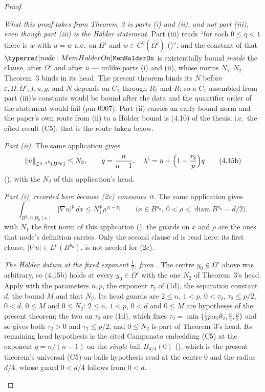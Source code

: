 \begin{proof}
\begin{enumerate}
  \emph{What this proof takes from Theorem~3 is parts \textup{(i)} and
  \textup{(ii)}, and \emph{not} part \textup{(iii)}, even though part
  \textup{(iii)} is the H\"older statement.}  Part (iii) reads ``for each
  $0\le\eta<1$ there is $w$ with $u=w$ a.e.\ on $\Omega'$ and
  $w\in C^{\eta}(\overline{\Omega'})$ ()'', and the
  constant of that $\noderef{MemHolderOn}$ is existentially bound \emph{inside}
  the clause, after $\Omega'$ and after $u$ --- unlike parts (i) and (ii), whose
  norms $N_1,N_2$ Theorem~3 binds in its head.  The present theorem binds its
  $N$ before $\varepsilon,\Omega,\Omega',f,u,g$, and $N$ depends on $C_1$
  through $R_1$ and $R$; so a $C_1$ assembled from part (iii)'s constants would
  be bound after the data and the quantifier order of the statement would fail
  (pm-0007).  Part (ii) carries an early-bound norm and the paper's own route
  from (ii) to a H\"older bound is (4.10) of the thesis, i.e.\ the cited result (C5);
  that is the route taken below.

  \emph{Part \textup{(ii)}.}  The same application gives
  \[
  \|u\|_{\mathcal L^{q,\,\lambda^\natural}(B^{y_0})}\le N_2 ,
  \qquad
  q=\frac n{n-1},\quad \lambda^\natural=n+\Bigl(1-\frac{\tau_2}p\Bigr)q
  \tag{4.15b}
  \]
  (), with the $N_2$ of this application's head.

  \emph{Part \textup{(i)}, recorded here because \textup{(2c)} consumes it.}
  The same application gives
  \[
  \int_{B^{y_0}\cap B_\rho(x)}|\nabla u|^p\,dx\le N_1^{\,p}\rho^{\,n-\tau_2}
  \qquad\bigl(x\in B^{y_0},\ 0<\rho<\operatorname{diam}B^{y_0}=d/2\bigr),
  \tag{4.15a}
  \]
  with $N_1$ the first norm of this application
  (); the guards on $x$ and $\rho$ are the ones that
  node's definition carries.  Only the second clause of
   is read here; its
  first clause, $|\nabla u|\in L^p(B^{y_0})$, is not needed for (2c).

  \emph{The H\"older datum at the fixed exponent $\tfrac12$, from
  .}  The centre $y_0\in\Omega'$ above was
  arbitrary, so (4.15b) holds at every $y_0\in\Omega'$ with the one
  $N_2$ of Theorem~3's head.  Apply
   with the parameters $n,p$, the exponent
  $\tau_2$ of (1d), the separation constant $d$, the bound $M$ and that $N_2$.
  Its head guards are $2\le n$, $1<p$, $0<\tau_2$, $\tau_2\le p/2$, $0<d$,
  $0\le M$ and $0\le N_2$: $2\le n$, $1<p$, $0<d$ and $0\le M$ are hypotheses of
  the present theorem; the two on $\tau_2$ are (1d), which fixes
  $\tau_2=\min\{\tfrac12p\alpha_2\theta_2,\tfrac n2,\tfrac p2\}$ and so gives
  both $\tau_2>0$ and $\tau_2\le p/2$; and $0\le N_2$ is part of Theorem~3's
  head.  Its remaining head hypothesis is the cited Campanato embedding (C5) at
  the exponent $q=n/(n-1)$ on the \emph{single} ball $B_{d/4}(0)$
  (), which is the present theorem's universal
  (C5)-on-balls hypothesis read at the centre $0$ and the radius $d/4$, whose
  guard $0<d/4$ follows from $0<d$.


\end{enumerate}
\end{proof}
